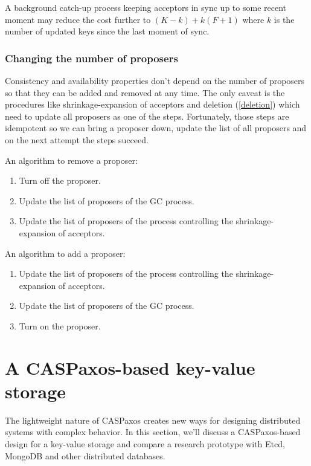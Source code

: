 \documentclass[a4paper,USenglish]{lipics-v2018}
\theoremstyle{definition}
\begin{document}
    A background catch-up process keeping acceptors in sync up to some recent moment may reduce the cost further to $(K-k) + k(F+1)$ where $k$ is the number of updated keys since the last moment of sync.

\subsubsection{Changing the number of proposers}

    Consistency and availability properties don't depend on the number of proposers so that they can be added and removed at any time. The only caveat is the procedures like shrinkage-expansion of acceptors and deletion (\ref{deletion}) which need to update all proposers as one of the steps. Fortunately, those steps are idempotent so we can bring a proposer down, update the list of all proposers and on the next attempt the steps succeed.

    An algorithm to remove a proposer:

    \begin{enumerate}
    \item Turn off the proposer.
    \item Update the list of proposers of the GC process.
    \item Update the list of proposers of the process controlling the shrinkage-expansion of acceptors.
    \end{enumerate}

    An algorithm to add a proposer:

    \begin{enumerate}
    \item Update the list of proposers of the process controlling the shrinkage-expansion of acceptors.
    \item Update the list of proposers of the GC process.
    \item Turn on the proposer.
    \end{enumerate}

\section{A CASPaxos-based key-value storage}

    The lightweight nature of CASPaxos creates new ways for designing distributed systems with complex behavior. In this section, we'll discuss a CASPaxos-based design for a key-value storage and compare a research prototype with Etcd, MongoDB and other distributed databases.
\end{document}
